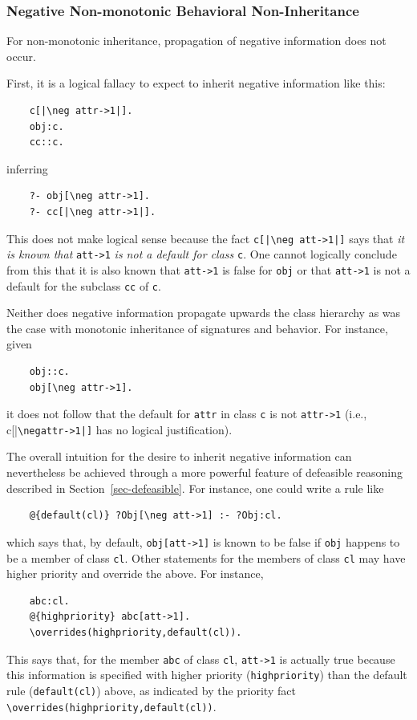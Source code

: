 \documentclass[11pt]{article}
\newcommand{\bs}{\textbackslash}
\newcommand{\RULELOGNEG}{{\texttt{{\bs}neg}}\xspace}
\begin{document}
\subsubsection{Negative Non-monotonic Behavioral Non-Inheritance}

For non-monotonic inheritance, propagation of negative information does not
occur.

First, it is a logical fallacy to expect to inherit negative information like
this:
\begin{verbatim}
    c[|\neg attr->1|].
    obj:c.
    cc::c.
\end{verbatim}
inferring
\begin{verbatim}
    ?- obj[\neg attr->1].
    ?- cc[|\neg attr->1|].
\end{verbatim}
This does not make logical sense because the fact \texttt{c[|\RULELOGNEG att->1|]} says
that \emph{it is known that} \verb|att->1| \emph{is not a default for
  class} \texttt{c}. One cannot logically conclude from this that
it is also known that \verb|att->1| is false for \texttt{obj} or that 
\verb|att->1| is not a default for the subclass \texttt{cc} of \texttt{c}.  

Neither does negative information propagate upwards the class hierarchy as
was the case with monotonic inheritance of signatures and behavior. For
instance, given
\begin{verbatim}
    obj::c.
    obj[\neg attr->1].
\end{verbatim}
it does not follow that the default for \texttt{attr} in class \texttt{c}
is not \texttt{attr->1} (i.e., c[|\RULELOGNEG \texttt{attr->1|]} has no logical
justification).

The overall intuition for the desire to inherit negative information can
nevertheless be achieved through a more powerful feature of defeasible
reasoning described in Section~\ref{sec-defeasible}. For instance, one could
write a rule like
\begin{verbatim}
    @{default(cl)} ?Obj[\neg att->1] :- ?Obj:cl.
\end{verbatim}
which says that, by default, \verb|obj[att->1]| is known to be false if
\texttt{obj} happens to be a member of class \texttt{cl}. Other statements
for the members of class \texttt{cl} may have higher priority and override
the above. For instance,
\begin{verbatim}
    abc:cl.
    @{highpriority} abc[att->1].
    \overrides(highpriority,default(cl)).
\end{verbatim}
This says that, for the member \texttt{abc} of class \texttt{cl},  
\verb|att->1| is actually true because this information is specified with
higher priority (\texttt{highpriority})  than the default rule
(\texttt{default(cl)}) above, as indicated by the priority fact
\texttt{\bs{}overrides(highpriority,default(cl))}. 
\end{document}
